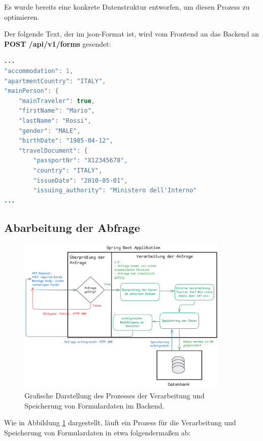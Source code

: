 Es wurde bereits eine konkrete Datenstruktur entworfen, um diesen Prozess zu optimieren.

Der folgende Text, der im \gls{json}-Format ist, wird vom Frontend an das Backend an \textbf{POST /api/v1/forms} gesendet: \cite{website-git-backend-repo}

\begin{lstlisting}[language=Java, caption={Beispiel-Anfrage an das Backend.}]
...
"accommodation": 1,
"apartmentCountry": "ITALY",
"mainPerson": {
	"mainTraveler": true,
	"firstName": "Mario",
	"lastName": "Rossi",
	"gender": "MALE",
	"birthDate": "1985-04-12",
	"travelDocument": {
		"passportNr": "X12345678",
		"country": "ITALY",
		"issueDate": "2010-05-01",
		"issuing_authority": "Ministero dell'Interno"
...
\end{lstlisting}
		
		\subsection{Abarbeitung der Abfrage}
		
		\begin{figure}
			\centering
			\includegraphics[width=0.9\textwidth]{images/Workflow-backend-post-form.png}
			\caption{Grafische Darstellung des Prozesses der Verarbeitung und Speicherung von Formulardaten im Backend.}
            \label{workflow-form-data-process-backend}
		\end{figure}
		
		Wie in Abbildung \ref{workflow-form-data-process-backend} dargestellt, läuft ein Prozess für die Verarbeitung und Speicherung von Formulardaten in etwa folgendermaßen ab:
		
